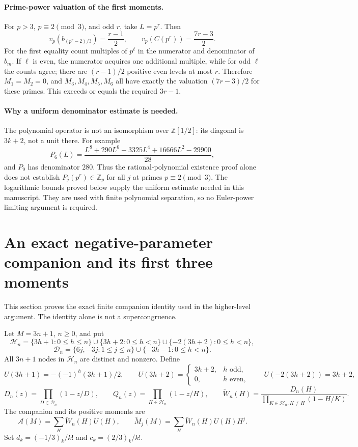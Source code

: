 \documentclass[11pt,letterpaper]{article}
\numberwithin{equation}{section}
\begin{document}
\paragraph{Prime-power valuation of the first moments.}
For $p>3$, $p\equiv2\pmod3$, and odd $r$, take $L=p^r$.
Then
\[
 v_p(b_{(p^r-2)/3})=\frac{r-1}{2},\qquad
 v_p(C(p^r))=\frac{7r-3}{2}.
\]
For the first equality count multiples of $p^\ell$ in the numerator
and denominator of $b_m$. If $\ell$ is even, the numerator acquires
one additional multiple, while for odd $\ell$ the counts agree;
there are $(r-1)/2$ positive even levels at most $r$.
Therefore $M_1=M_2=0$, and $M_3,M_4,M_5,M_6$ all have exactly the
valuation $(7r-3)/2$ for these primes. This exceeds or equals the
required $3r-1$.

\paragraph{Why a uniform denominator estimate is needed.}
The polynomial operator is not an isomorphism over
$\mathbb Z[1/2]$: its diagonal is $3k+2$, not a unit there.
For example
\[
 P_6(L)=\frac{L^8+290L^6-3325L^4+16666L^2-29900}{28},
\]
and $P_9$ has denominator $280$. Thus the rational-polynomial
existence proof alone does not establish $P_j(p^r)\in\mathbb Z_p$
for all $j$ at primes $p\equiv2\pmod3$. The logarithmic bounds proved below supply the uniform estimate
needed in this manuscript. They are used with finite polynomial
separation, so no Euler-power limiting argument is required.

\section{An exact negative-parameter companion and its first three moments}\label{loc-VII-4}
\label{VII-sec:E7companion}
This section proves the exact finite companion identity used in the
higher-level argument. The identity alone is not a supercongruence.

Let $M=3n+1$, $n\ge0$, and put
\[
 \mathcal H_n=\{3h+1:0\le h\le n\}
 \cup\{3h+2:0\le h<n\}\cup\{-2(3h+2):0\le h<n\},
\]
\[
 \mathcal D_n=\{6j,-3j:1\le j\le n\}
 \cup\{-3h-1:0\le h<n\}.
\]
All $3n+1$ nodes in $\mathcal H_n$ are distinct and nonzero. Define
\[
 U(3h+1)=-(-1)^h(3h+1)/2,\qquad
 U(3h+2)=\begin{cases}3h+2,&h\text{ odd},\\0,&h\text{ even},\end{cases}
 \qquad U(-2(3h+2))=3h+2,
\]
\[
 D_n(z)=\prod_{D\in\mathcal D_n}(1-z/D),\qquad
 Q_n(z)=\prod_{H\in\mathcal H_n}(1-z/H),\qquad
 \widetilde W_n(H)=\frac{D_n(H)}{\prod_{K\in\mathcal H_n,K\ne H}(1-H/K)}.
\]
The companion and its positive moments are
\[
 \mathcal A(M)=\sum_H\widetilde W_n(H)U(H),\qquad
 \widetilde M_j(M)=\sum_H\widetilde W_n(H)U(H)H^j.
\]
Set $d_k=(-1/3)_k/k!$ and $c_k=(2/3)_k/k!$.
\end{document}
